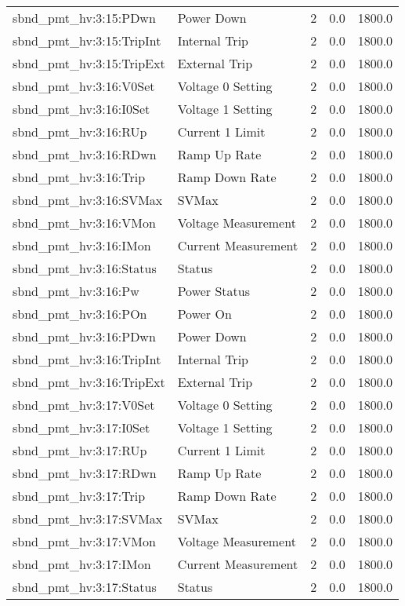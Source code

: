 \begin{center}
\begin{longtable}{l | l l l l }
sbnd\_pmt\_hv:3:15:PDwn & Power Down & 2 & 0.0 & 1800.0\\ 
sbnd\_pmt\_hv:3:15:TripInt & Internal Trip & 2 & 0.0 & 1800.0\\ 
sbnd\_pmt\_hv:3:15:TripExt & External Trip & 2 & 0.0 & 1800.0\\ 
sbnd\_pmt\_hv:3:16:V0Set & Voltage 0 Setting & 2 & 0.0 & 1800.0\\ 
sbnd\_pmt\_hv:3:16:I0Set & Voltage 1 Setting & 2 & 0.0 & 1800.0\\ 
sbnd\_pmt\_hv:3:16:RUp & Current 1 Limit & 2 & 0.0 & 1800.0\\ 
sbnd\_pmt\_hv:3:16:RDwn & Ramp Up Rate & 2 & 0.0 & 1800.0\\ 
sbnd\_pmt\_hv:3:16:Trip & Ramp Down Rate & 2 & 0.0 & 1800.0\\ 
sbnd\_pmt\_hv:3:16:SVMax & SVMax & 2 & 0.0 & 1800.0\\ 
sbnd\_pmt\_hv:3:16:VMon & Voltage Measurement & 2 & 0.0 & 1800.0\\ 
sbnd\_pmt\_hv:3:16:IMon & Current Measurement & 2 & 0.0 & 1800.0\\ 
sbnd\_pmt\_hv:3:16:Status & Status & 2 & 0.0 & 1800.0\\ 
sbnd\_pmt\_hv:3:16:Pw & Power Status & 2 & 0.0 & 1800.0\\ 
sbnd\_pmt\_hv:3:16:POn & Power On & 2 & 0.0 & 1800.0\\ 
sbnd\_pmt\_hv:3:16:PDwn & Power Down & 2 & 0.0 & 1800.0\\ 
sbnd\_pmt\_hv:3:16:TripInt & Internal Trip & 2 & 0.0 & 1800.0\\ 
sbnd\_pmt\_hv:3:16:TripExt & External Trip & 2 & 0.0 & 1800.0\\ 
sbnd\_pmt\_hv:3:17:V0Set & Voltage 0 Setting & 2 & 0.0 & 1800.0\\ 
sbnd\_pmt\_hv:3:17:I0Set & Voltage 1 Setting & 2 & 0.0 & 1800.0\\ 
sbnd\_pmt\_hv:3:17:RUp & Current 1 Limit & 2 & 0.0 & 1800.0\\ 
sbnd\_pmt\_hv:3:17:RDwn & Ramp Up Rate & 2 & 0.0 & 1800.0\\ 
sbnd\_pmt\_hv:3:17:Trip & Ramp Down Rate & 2 & 0.0 & 1800.0\\ 
sbnd\_pmt\_hv:3:17:SVMax & SVMax & 2 & 0.0 & 1800.0\\ 
sbnd\_pmt\_hv:3:17:VMon & Voltage Measurement & 2 & 0.0 & 1800.0\\ 
sbnd\_pmt\_hv:3:17:IMon & Current Measurement & 2 & 0.0 & 1800.0\\ 
sbnd\_pmt\_hv:3:17:Status & Status & 2 & 0.0 & 1800.0\\ 

\end{longtable}
\end{center}
